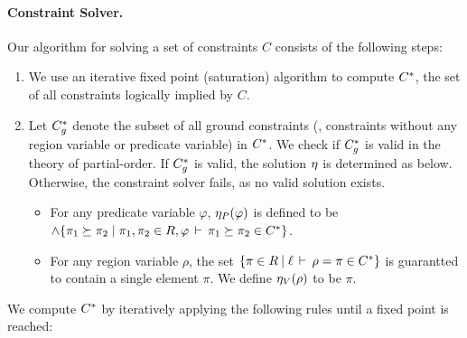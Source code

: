 \paragraph{Constraint Solver.}
Our algorithm for solving a set of constraints $C$ consists of the following steps:
\begin{enumerate}
\item We use an iterative fixed point (saturation) algorithm to compute
${C}^*$, the set of all constraints logically implied by $C$.
\item Let ${C}^*_g$ denote the subset of all ground constraints
(\ie, constraints without any region variable or predicate variable)
in ${C}^*$. We check if ${C}^*_g$ is valid in the theory of
partial-order. If ${C}^*_g$ is valid, the solution $\eta$ is determined
as below. Otherwise, the constraint solver fails, as no valid solution exists.
\begin{itemize}
\item For any predicate variable $\varphi$, $\eta_P(\varphi)$ is defined
to be $\wedge \{ \pi_1 \succeq \pi_2 \;|\; \pi_1, \pi_2 \in R, \varphi\,\vdash\,\pi_1 \succeq \pi_2 \in {C}^* \}$.
\item For any region variable $\rho$,  the set
 $\{ \pi \in R \:|\; \ell\,\vdash\,\rho = \pi \in {C}^* \}$ 
is guarantted to contain a single element $\pi$.
We define $\eta_V(\rho)$ to be $\pi$.
\end{itemize}
\end{enumerate}

We compute ${C}^*$ by iteratively applying the following rules until a fixed
point is reached:


